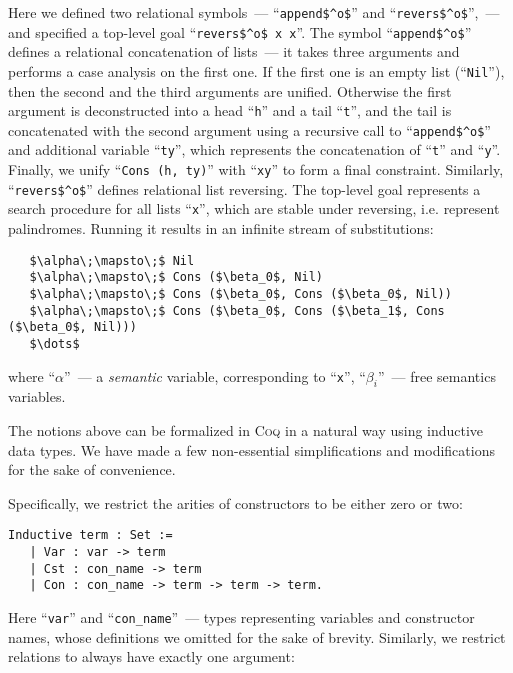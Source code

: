 Here we defined two relational symbols~--- ``\lstinline|append$^o$|'' and ``\lstinline|revers$^o$|'',~--- and specified a top-level goal ``\lstinline|revers$^o$ x x|''.
The symbol ``\lstinline|append$^o$|'' defines a relational concatenation of lists~--- it takes three arguments and performs a case analysis on the first one. If the
first one is an empty list (``\lstinline|Nil|''), then the second and the third arguments are unified. Otherwise the first argument is deconstructed into a head ``\lstinline|h|''
and a tail ``\lstinline|t|'', and the tail is concatenated with the second argument using a recursive call to ``\lstinline|append$^o$|'' and additional variable ``\lstinline|ty|'', which
represents the concatenation of ``\lstinline|t|'' and ``\lstinline|y|''. Finally, we unify ``\lstinline|Cons (h, ty)|'' with ``\lstinline|xy|'' to form a final constraint. Similarly,
``\lstinline|revers$^o$|'' defines relational list reversing. The top-level goal represents a search procedure for all lists ``\lstinline|x|'', which are stable under reversing, i.e.
represent palindromes. Running it results in an infinite stream of substitutions:

\begin{lstlisting}
   $\alpha\;\mapsto\;$ Nil
   $\alpha\;\mapsto\;$ Cons ($\beta_0$, Nil)
   $\alpha\;\mapsto\;$ Cons ($\beta_0$, Cons ($\beta_0$, Nil))
   $\alpha\;\mapsto\;$ Cons ($\beta_0$, Cons ($\beta_1$, Cons ($\beta_0$, Nil)))
   $\dots$
\end{lstlisting}

where ``$\alpha$''~--- a \emph{semantic} variable, corresponding to ``\lstinline|x|'', ``$\beta_i$''~--- free semantics variables.

The notions above can be formalized in \textsc{Coq} in a natural way using inductive data types. We have made a few non-essential simplifications and modifications for the sake of convenience.

Specifically, we restrict the arities of constructors to be either zero or two:

\begin{lstlisting}[language=Coq]
   Inductive term : Set :=
   | Var : var -> term
   | Cst : con_name -> term
   | Con : con_name -> term -> term -> term.
\end{lstlisting}

Here ``\lstinline[language=Coq]{var}'' and ``\lstinline[language=Coq]{con_name}''~--- types representing variables and constructor names, whose definitions we omitted for the sake of brevity.
Similarly, we restrict relations to always have exactly one argument:

